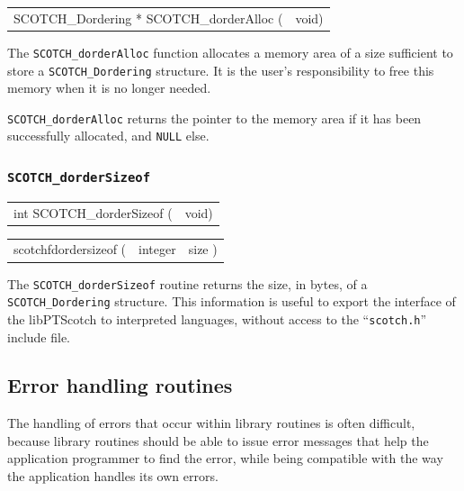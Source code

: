\begin{itemize}
\progsyn

{\tt\begin{tabular}{l@{}l}
SCOTCH\_Dordering * SCOTCH\_dorderAlloc ( & void)
\end{tabular}}

\progdes

The {\tt SCOTCH\_dorderAlloc} function allocates a memory area of a
size sufficient to store a {\tt SCOTCH\_\lbt Dordering} structure. It is
the user's responsibility to free this memory when it is no longer
needed.

\progret

{\tt SCOTCH\_dorderAlloc} returns the pointer to the memory area if it
has been successfully allocated, and {\tt NULL} else.
\end{itemize}

\subsubsection{{\tt SCOTCH\_dorderSizeof}}

\begin{itemize}
\progsyn

{\tt\begin{tabular}{l@{}l}
int SCOTCH\_dorderSizeof ( & void)
\end{tabular}}

{\tt\begin{tabular}{l@{}ll}
scotchfdordersizeof ( & integer & size )
\end{tabular}}

\progdes

The {\tt SCOTCH\_dorderSizeof} routine returns the size, in bytes, of a
{\tt SCOTCH\_\lbt Dordering} structure. This information is useful to
export the interface of the {\sc libPTScotch} to interpreted languages,
without access to the ``{\tt scotch.h}'' include file.
\end{itemize}

\subsection{Error handling routines}
\label{sec-lib-func-error}

The handling of errors that occur within library routines is
often difficult, because library routines should be able to issue
error messages that help the application programmer to find the
error, while being compatible with the way the application handles
its own errors.


